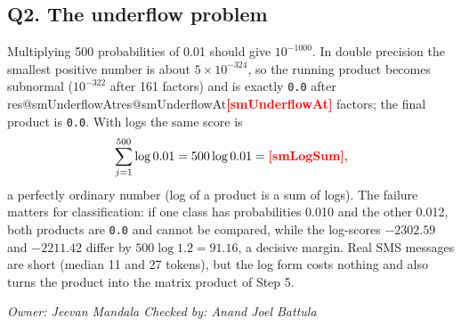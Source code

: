 \documentclass[11pt]{article}
\makeatletter
\newcommand{\fillin}[1]{\textcolor{red}{\textbf{[#1]}}}
\newcommand{\res}[1]{\ifcsname res@#1\endcsname\csname res@#1\endcsname\else\fillin{#1}\fi}
\newcommand{\owner}[2]{\par\noindent\textit{Owner: #1 \hfill Checked by: #2}\par\medskip}
\theoremstyle{plain}
\makeatother
\begin{document}
\subsection{Q2. The underflow problem}\label{sec:q2}
Multiplying 500 probabilities of 0.01 should give $10^{-1000}$. In double precision the smallest
positive number is about $5\times10^{-324}$, so the running product becomes subnormal
($10^{-322}$ after 161 factors) and is exactly \texttt{0.0} after \res{smUnderflowAt} factors; the final
product is \texttt{0.0}. With logs the same score is
\[
\sum_{j=1}^{500}\log 0.01=500\log 0.01=\res{smLogSum},
\]
a perfectly ordinary number (log of a product is a sum of logs). The failure matters for
classification: if one class has probabilities 0.010 and the other 0.012, both products are
\texttt{0.0} and cannot be compared, while the log-scores $-2302.59$ and $-2211.42$ differ by
$500\log1.2=91.16$, a decisive margin. Real SMS messages are short (median 11 and 27 tokens),
but the log form costs nothing and also turns the product into the matrix product of Step 5.
\owner{Jeevan Mandala}{Anand Joel Battula}

\end{document}
